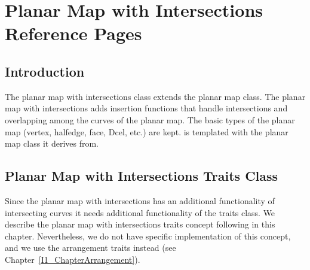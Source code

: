 


\clearpage
\section{Planar Map with Intersections Reference Pages}

\subsection*{Introduction}

The planar map with intersections class extends the planar map
class. The planar map with intersections adds insertion functions
that handle intersections and overlapping among the curves of the
planar map. The basic types of the planar map (vertex, halfedge,
face, Dcel, etc.) are kept. 
is templated with the planar map class it derives from.

\subsection*{Planar Map with Intersections Traits Class}
Since the planar map with intersections has an additional
functionality of intersecting curves it needs additional
functionality of the traits class. We describe the planar map with
intersections traits concept following in this chapter.
Nevertheless, we do not have specific implementation of this
concept, and we use the arrangement traits instead (see
Chapter~\ref{I1_ChapterArrangement}).

